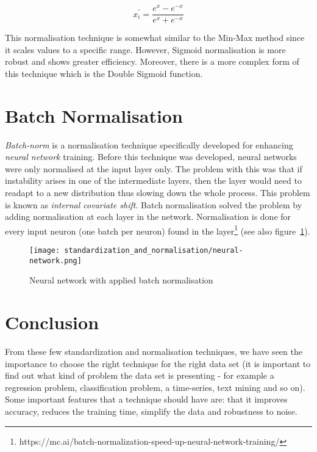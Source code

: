 \begin{equation}
\label{eq:sn_tan-sig}
x^{\prime}_{i} = \frac{e^{x} - e^{-x}}{e^{x} + e^{-x}}
\end{equation}

This normalisation technique is somewhat similar to the Min-Max method since it scales values to a specific range.  However, Sigmoid normalisation is more robust and shows greater efficiency\citep{jain2005score}.  Moreover, there is a more complex form of this technique which is the Double Sigmoid function\citep{cappelli2000combining}.

\section{Batch Normalisation}
\emph{Batch-norm} is a normalisation technique specifically developed for enhancing \emph{neural network} training.  Before this technique was developed, neural networks were only normalised at the input layer only.  The problem with this was that if instability arises in one of the intermediate layers, then the layer would need to readapt to a new distribution thus slowing down the whole process.  This problem is known as \emph{internal covariate shift}\citep{ioffe2015batch}.  Batch normalisation solved the problem by adding normalisation at each layer in the network.  Normalisation is done for every input neuron (one batch per neuron) found in the layer\footnote{https://mc.ai/batch-normalization-speed-up-neural-network-training/} (see also figure~\ref{fig:sn_neural}).

\begin{figure}
	\texttt{[image: standardization\_and\_normalisation/neural-network.png]}
	\caption{Neural network with applied batch normalisation}
	\label{fig:sn_neural}
\end{figure} 

\section{Conclusion}
From these few standardization and normalisation techniques, we have seen the importance to choose the right technique for the right data set (it is important to find out what kind of problem the data set is presenting - for example a regression problem, classification problem, a time-series, text mining and so on).  Some important features that a technique should have are: that it improves accuracy, reduces the training time, simplify the data and robustness to noise.


